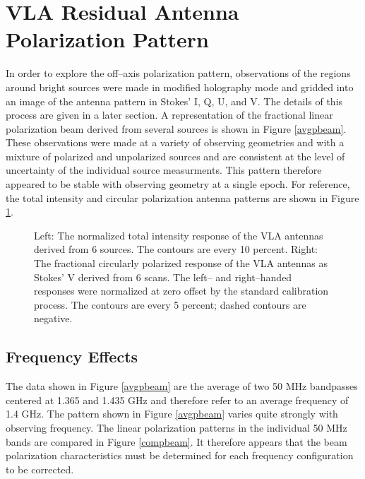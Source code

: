 \section {VLA Residual Antenna Polarization Pattern}

   In order to explore the off--axis polarization pattern, observations
of the regions around bright sources were made in modified
holography mode and gridded into an image of the antenna pattern
in Stokes' I, Q, U, and V.
The details of this process are given in a later section.
A representation of the fractional linear polarization beam derived
from several sources is shown in Figure \ref{avgpbeam}.
These observations were made at a variety of observing geometries and
with a mixture of polarized and unpolarized sources and are consistent
at the level of uncertainty of the individual source measurments.
This pattern therefore appeared to be stable with observing geometry
at a single epoch.
For reference, the total intensity and circular polarization
antenna patterns are shown in Figure \ref{IVbeam}.

\begin{figure}
\centerline{\hbox{}
   \hbox{}}
\caption{
Left: The normalized total intensity response of the VLA antennas
derived from 6 sources.
The contours are every 10 percent.
\hfill\break
Right: The fractional circularly polarized response of the VLA
antennas as Stokes' V derived from 6 scans.  The left-- and right--handed
responses were normalized at zero offset by the standard calibration
process.
The contours are every 5 percent; dashed contours are negative.
}
\label{IVbeam}
\end{figure}


\subsection {Frequency Effects}

   The data shown in Figure \ref{avgpbeam} are the average of two 50
MHz bandpasses centered at 1.365 and 1.435 GHz and therefore refer to
an average frequency of 1.4 GHz.  The pattern shown in Figure
\ref{avgpbeam} varies quite strongly with observing frequency.  The
linear polarization patterns in the individual 50 MHz bands are
compared in Figure \ref{compbeam}.  It therefore appears that the beam
polarization characteristics must be determined for each frequency
configuration to be corrected.

